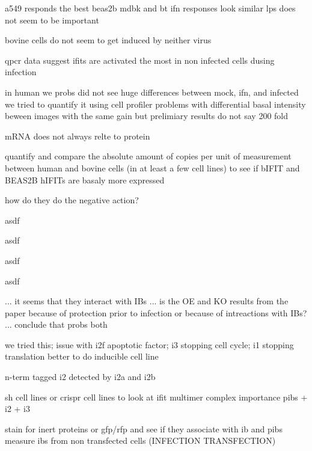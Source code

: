 a549 responds the best
beas2b mdbk and bt ifn responses look similar
lps does not seem to be important

bovine cells do not seem to get induced by neither virus


qpcr data suggest ifits are activated the most in non infected cells dusing infection

in human we probs did not see huge differences between mock, ifn, and infected
we tried to quantify it using cell profiler \cite{McQuin2018CellProfilerBiology}
problems with differential basal intensity beween images with the same gain
but prelimiary results do not say 200 fold

mRNA does not always relte to protein \cite{Liu2016OnAbundance, Buccitelli2020MRNAsControl}

quantify and compare the absolute amount of copies per unit of measurement between human and bovine cells (in at least a few cell lines) to see if bIFIT and BEAS2B hIFITs are basaly more expressed

how do they do the negative action?

asdf

asdf

asdf

asdf


... it seems that they interact with IBs ... is the OE and KO results from the paper because of protection prior to infection or because of intreactions with IBs? ... conclude that probs both



we tried this; issue with i2f apoptotic factor; i3 stopping cell cycle; i1 stopping translation
better to do inducible cell line

n-term tagged i2 detected by i2a and i2b

sh cell lines or crispr cell lines to look at ifit multimer complex importance
pibs + i2 + i3

stain for inert proteins or gfp/rfp and see if they associate with ib and pibs
measure ibs from non transfected cells (INFECTION TRANSFECTION)

